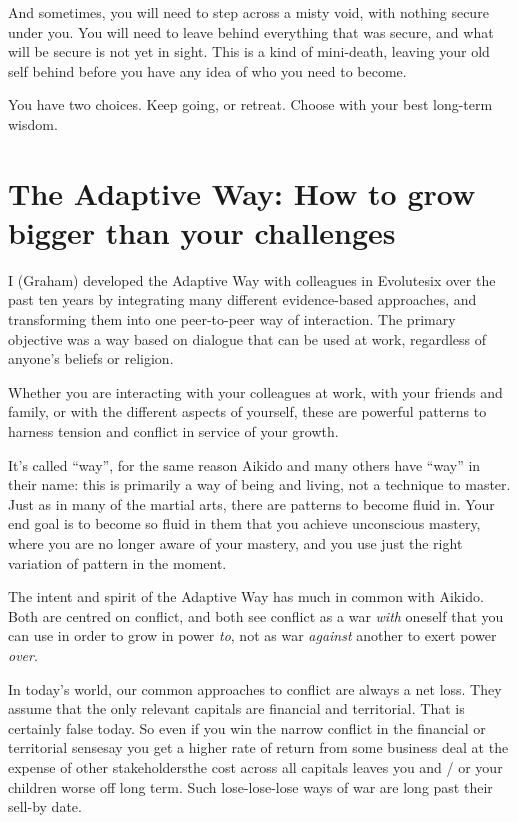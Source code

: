 And sometimes, you will need to step across a misty void, with nothing secure under you. You will need to leave behind everything that was secure, and what will be secure is not yet in sight. This is a kind of mini-death, leaving your old self behind before you have any idea of who you need to become. 


You have two choices. Keep going, or retreat. Choose with your best long-term wisdom. 




\section{The Adaptive Way: How to grow bigger than your challenges}
I (Graham) developed the Adaptive Way  with colleagues in Evolutesix  over the past ten years by integrating many different evidence-based approaches, and transforming them into one peer-to-peer way of interaction. The primary objective was a way based on dialogue that can be used at work, regardless of anyone’s beliefs or religion. 


Whether you are interacting with your colleagues at work, with your friends and family, or with the different aspects of yourself, these are powerful patterns to harness tension and conflict in service of your growth. 


It’s called “way”, for the same reason Aikido and many others have “way” in their name: this is primarily a way of being and living, not a technique to master. Just as in many of the martial arts, there are patterns to become fluid in. Your end goal is to become so fluid in them that you achieve unconscious mastery, where you are no longer aware of your mastery, and you use just the right variation of pattern in the moment.


The intent and spirit of the Adaptive Way has much in common with Aikido. Both are centred on conflict, and both see conflict as a war \emph{with} oneself that you can use in order to grow in power \emph{to}, not as war \emph{against} another to exert power \emph{over}.


In today’s world, our common approaches to conflict  are always a net loss. They assume that the only relevant capitals are financial and territorial. That is certainly false today. So even if you win the narrow conflict in the financial or territorial sense\textemdash say you get a higher rate of return from some business deal at the expense of other stakeholders\textemdash the cost across all capitals leaves you and / or your children worse off long term. Such lose-lose-lose ways of war are long past their sell-by date. 


